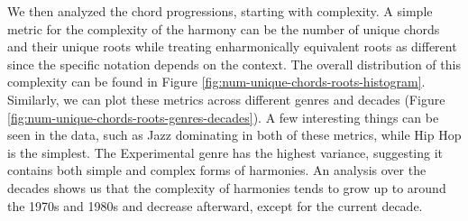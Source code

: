 \documentclass{article}
\begin{document}
We then analyzed the chord progressions, starting with complexity. A simple metric for the complexity of the harmony can be the number of unique chords and their unique roots while treating enharmonically equivalent roots as different since the specific notation depends on the context. The overall distribution of this complexity can be found in Figure \ref{fig:num-unique-chords-roots-histogram}. Similarly, we can plot these metrics across different genres and decades (Figure \ref{fig:num-unique-chords-roots-genres-decades}). A few interesting things can be seen in the data, such as Jazz dominating in both of these metrics, while Hip Hop is the simplest. The Experimental genre has the highest variance, suggesting it contains both simple and complex forms of harmonies. An analysis over the decades shows us that the complexity of harmonies tends to grow up to around the 1970s and 1980s and decrease afterward, except for the current decade.
\end{document}
